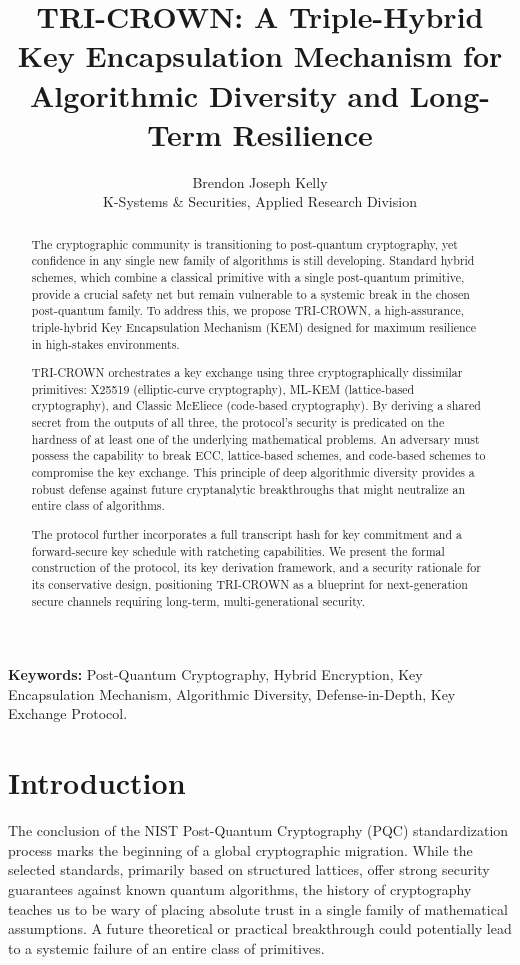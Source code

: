 \documentclass[11pt]{article}
\title{TRI-CROWN: A Triple-Hybrid Key Encapsulation Mechanism for Algorithmic Diversity and Long-Term Resilience}
\author{Brendon Joseph Kelly \\ K-Systems \& Securities, Applied Research Division}
\date{}
\begin{document}
\maketitle

\begin{abstract}
The cryptographic community is transitioning to post-quantum cryptography, yet confidence in any single new family of algorithms is still developing. Standard hybrid schemes, which combine a classical primitive with a single post-quantum primitive, provide a crucial safety net but remain vulnerable to a systemic break in the chosen post-quantum family. To address this, we propose TRI-CROWN, a high-assurance, triple-hybrid Key Encapsulation Mechanism (KEM) designed for maximum resilience in high-stakes environments.

TRI-CROWN orchestrates a key exchange using three cryptographically dissimilar primitives: X25519 (elliptic-curve cryptography), ML-KEM (lattice-based cryptography), and Classic McEliece (code-based cryptography). By deriving a shared secret from the outputs of all three, the protocol's security is predicated on the hardness of at least one of the underlying mathematical problems. An adversary must possess the capability to break ECC, lattice-based schemes, and code-based schemes to compromise the key exchange. This principle of deep algorithmic diversity provides a robust defense against future cryptanalytic breakthroughs that might neutralize an entire class of algorithms.

The protocol further incorporates a full transcript hash for key commitment and a forward-secure key schedule with ratcheting capabilities. We present the formal construction of the protocol, its key derivation framework, and a security rationale for its conservative design, positioning TRI-CROWN as a blueprint for next-generation secure channels requiring long-term, multi-generational security.
\end{abstract}

\textbf{Keywords:} Post-Quantum Cryptography, Hybrid Encryption, Key Encapsulation Mechanism, Algorithmic Diversity, Defense-in-Depth, Key Exchange Protocol.

\section{Introduction}
The conclusion of the NIST Post-Quantum Cryptography (PQC) standardization process marks the beginning of a global cryptographic migration. While the selected standards, primarily based on structured lattices, offer strong security guarantees against known quantum algorithms, the history of cryptography teaches us to be wary of placing absolute trust in a single family of mathematical assumptions. A future theoretical or practical breakthrough could potentially lead to a systemic failure of an entire class of primitives.
\end{document}
